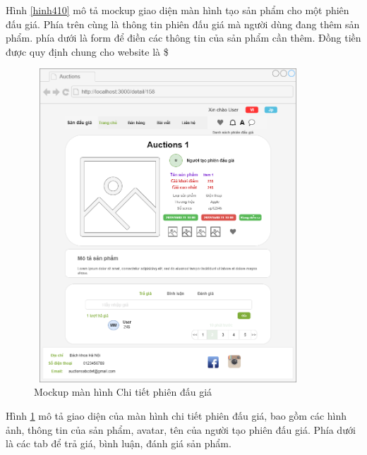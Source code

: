 \documentclass{article}
\begin{document}
Hình \ref{hinh410} mô tả mockup giao diện màn hình tạo sản phẩm cho một phiên đấu giá. Phía trên cùng là thông tin phiên đấu giá mà người dùng đang thêm sản phẩm. phía dưới là form để điền các thông tin của sản phẩm cần thêm. Đồng tiền được quy định chung cho website là \$
\begin{figure}[H]
    \centering
    \includegraphics[width=10.04cm,height=11.76cm]{images/detailitem.png}
    \caption{Mockup màn hình Chi tiết phiên đấu giá}
    \label{hinh411}
\end{figure}
Hình \ref{hinh411} mô tả giao diện của màn hình chi tiết phiên đấu giá, bao gồm các hình ảnh, thông tin của sản phẩm, avatar, tên của người tạo phiên đấu giá. Phía dưới là các tab để trả giá, bình luận, đánh giá sản phẩm. 
\end{document}
